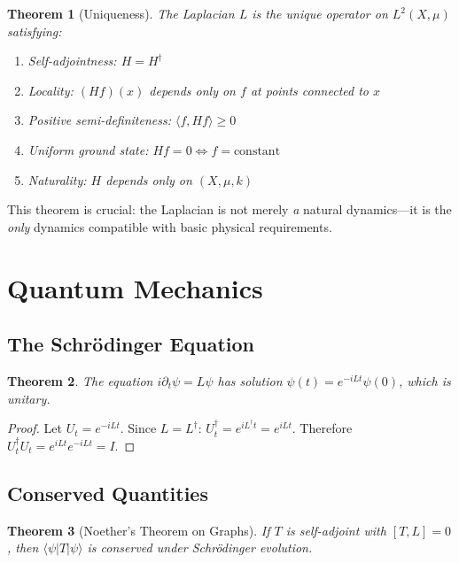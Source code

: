 \documentclass[11pt,a4paper]{article}
\theoremstyle{plain}
\newtheorem{theorem}{Theorem}[section]
\theoremstyle{definition}
\theoremstyle{remark}
\begin{document}
\begin{theorem}[Uniqueness]
\label{thm:uniqueness}
The Laplacian $L$ is the \emph{unique} operator on $L^2(X, \mu)$ satisfying:
\begin{enumerate}[noitemsep]
    \item Self-adjointness: $H = H^\dagger$
    \item Locality: $(Hf)(x)$ depends only on $f$ at points connected to $x$
    \item Positive semi-definiteness: $\langle f, Hf \rangle \geq 0$
    \item Uniform ground state: $Hf = 0 \Leftrightarrow f = \text{constant}$
    \item Naturality: $H$ depends only on $(X, \mu, k)$
\end{enumerate}
\end{theorem}

This theorem is crucial: the Laplacian is not merely \emph{a} natural dynamics---it is the \emph{only} dynamics compatible with basic physical requirements.

\section{Quantum Mechanics}

\subsection{The Schrödinger Equation}

\begin{theorem}
The equation $i\partial_t\psi = L\psi$ has solution $\psi(t) = e^{-iLt}\psi(0)$, which is unitary.
\end{theorem}

\begin{proof}
Let $U_t = e^{-iLt}$. Since $L = L^\dagger$: $U_t^\dagger = e^{iL^\dagger t} = e^{iLt}$.
Therefore $U_t^\dagger U_t = e^{iLt}e^{-iLt} = I$.
\end{proof}

\subsection{Conserved Quantities}

\begin{theorem}[Noether's Theorem on Graphs]
If $T$ is self-adjoint with $[T, L] = 0$, then $\langle\psi|T|\psi\rangle$ is conserved under Schrödinger evolution.
\end{theorem}
\end{document}
